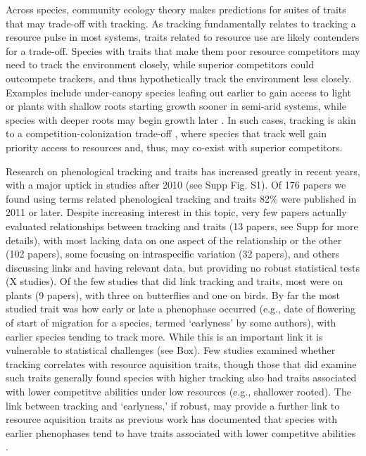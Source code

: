 \documentclass[11pt,letterpaper]{article}
\begin{document}
Across species, community ecology theory makes predictions for suites of traits that may trade-off with tracking. As tracking fundamentally relates to tracking a resource pulse in most systems, traits related to resource use are likely contenders for a trade-off. Species with traits that make them poor resource competitors may need to track the environment closely, while superior competitors could outcompete trackers, and thus hypothetically track the environment less closely. Examples include under-canopy species leafing out earlier to gain access to light \cite{pheberling2019} or plants with shallow roots starting growth sooner in semi-arid systems, while species with deeper roots may begin growth later \citep{Zhu2016BioLetters}. In such cases, tracking is akin to a competition-colonization trade-off \citep{Amarasekare:2003tq}, where species that track well gain priority access to resources and, thus, may co-exist with superior competitors. 

Research on phenological tracking and traits has increased greatly in recent years, with a major uptick in studies after 2010 (see Supp Fig. S1). Of 176 papers we found using terms related phenological tracking and traits 82\% were published in 2011 or later. Despite increasing interest in this topic, very few papers actually evaluated relationships between tracking and traits (13 papers, see Supp for more details), with most lacking data on one aspect of the relationship or the other (102 papers), some focusing on intraspecific variation (32 papers), and others discussing links and having relevant data, but providing no robust statistical tests (X studies). Of the few studies that did link tracking and traits, most were on plants (9 papers), with three on butterflies and one on birds. By far the most studied trait was how early or late a phenophase occurred (e.g., date of flowering of start of migration for a species, termed `earlyness' by some authors), with earlier species tending to track more. While this is an important link it is vulnerable to statistical challenges (see Box). Few studies examined whether tracking correlates with resource aquisition traits, though those that did examine such traits generally found species with higher tracking also had traits associated with lower competitve abilities under low resources (e.g., shallower rooted). The link between tracking and `earlyness,' if robust, may provide a further link to resource aquisition traits as previous work has documented that species with earlier phenophases tend to have traits associated with lower competitve abilities \citep[e.g., they tend to be of lower height, have shallower roots, narrower diameter vessels, thinner leaves, and grow faster,][]{wolkovich2014aob}. 
\end{document}
